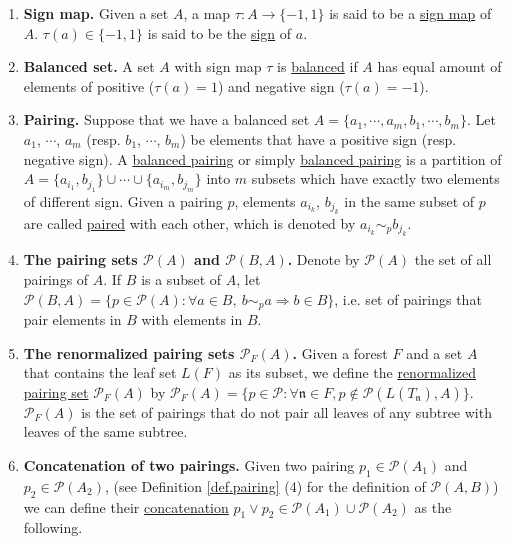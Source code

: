  \begin{defn}\label{def.pairing}
 \begin{enumerate}
  \item \textbf{Sign map.} Given a set $A$, a map $\tau:A\rightarrow \{-1,1\}$ is said to be a \underline{sign map} of $A$. $\tau(a)\in \{-1,1\}$ is said to be the \underline{sign} of $a$. 
  \item \textbf{Balanced set.} A set $A$ with sign map $\tau$ is \underline{balanced} if $A$ has equal amount of elements of positive ($\tau(a)=1$) and negative sign ($\tau(a)=-1$).
  \item \textbf{Pairing.} Suppose that we have a balanced set $A=\{a_1,\cdots,a_{m}, b_1, \cdots,b_m\}$. Let $a_1$, $\cdots$, $a_{m}$ (resp. $b_1$, $\cdots$, $b_{m}$) be elements that have a positive sign (resp. negative sign). A \underline{balanced pairing} or simply \underline{balanced pairing} is a partition of $A=\{a_{i_1},b_{j_1}\}\cup\cdots\cup \{a_{i_{m}},b_{j_m}\}$ into $m$ subsets which have exactly two elements of different sign. Given a pairing $p$, elements $a_{i_{k}}$, $b_{j_{k}}$ in the same subset of $p$ are called \underline{paired} with each other, which is denoted by $a_{i_{k}}\sim_{p} b_{j_{k}}$.
  \item \textbf{The pairing sets $\mathcal{P}(A)$ and $\mathcal{P}(B,A)$.} Denote by $\mathcal{P}(A)$ the set of all pairings of $A$. If $B$ is a subset of $A$, let $\mathcal{P}(B,A)=\{p\in \mathcal{P}(A):\forall a\in B,\ b\sim_{p}a \Rightarrow b\in B\}$, i.e. set of pairings that pair elements in $B$ with elements in $B$. 
  \item \textbf{The renormalized pairing sets $\mathcal{P}_F(A)$.} Given a forest $F$ and a set $A$ that contains the leaf set $L(F)$ as its subset, we define the \underline{renormalized pairing set} $\mathcal{P}_F(A)$ by $\mathcal{P}_F(A)=\{p\in\mathcal{P}:\forall \mathfrak{n}\in F,p\notin \mathcal{P}(L(T_{\mathfrak{n}}),A)\}$. $\mathcal{P}_F(A)$ is the set of pairings that do not pair all leaves of any subtree with leaves of the same subtree.
  \item \textbf{Concatenation of two pairings.} Given two pairing $p_1\in\mathcal{P}(A_1)$ and $p_2\in\mathcal{P}(A_2)$, (see Definition \ref{def.pairing} (4) for the definition of $\mathcal{P}(A,B)$) we can define their \underline{concatenation} $p_1\vee p_2\in \mathcal{P}(A_1)\cup \mathcal{P}(A_2)$ as the following. 
  

\end{enumerate}
\end{defn}
